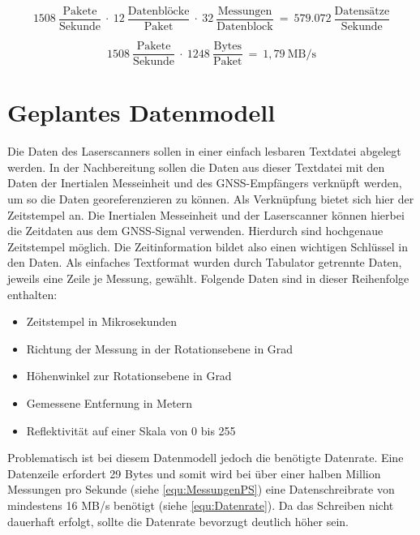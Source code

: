 \documentclass[a4paper,12pt,bibliography=totoc, listof=totoc,titlepage,pointlessnumbers]{scrreprt}
\begin{document}
\begin{equation}
1508~\frac{\text{Pakete}}{\text{Sekunde}}~\cdot~12~\frac{\text{Datenbl\"{o}cke}}{\text{Paket}}~\cdot~
32~\frac{\text{Messungen}}{\text{Datenblock}}~=~579.072~\frac{\text{Datens\"{a}tze}}{\text{Sekunde}}
 \label{equ:MessungenPS}
\end{equation}

\begin{equation}
1508~\frac{\text{Pakete}}{\text{Sekunde}}~\cdot~1248~\frac{\text{Bytes}}{\text{Paket}}~=~1,79~\text{MB/s}
 \label{equ:Ausgangsrate}
\end{equation}

\section{Geplantes Datenmodell}
\label{s:datenmodell}
Die Daten des Laserscanners sollen in einer einfach lesbaren Textdatei abgelegt werden. In der Nachbereitung sollen die Daten aus dieser Textdatei mit den Daten der Inertialen Messeinheit und des GNSS-Empfängers verknüpft werden, um so die Daten georeferenzieren zu können. Als Verknüpfung bietet sich hier der Zeitstempel an. Die Inertialen Messeinheit und der Laserscanner können hierbei die Zeitdaten aus dem GNSS-Signal verwenden. Hierdurch sind hochgenaue Zeitstempel möglich. Die Zeitinformation bildet also einen wichtigen Schlüssel in den Daten. Als einfaches Textformat wurden durch Tabulator getrennte Daten, jeweils eine Zeile je Messung, gewählt. Folgende Daten sind in dieser Reihenfolge enthalten:

\begin{itemize}
 \item Zeitstempel in Mikrosekunden
 \item Richtung der Messung in der Rotationsebene in Grad
 \item Höhenwinkel zur Rotationsebene in Grad
 \item Gemessene Entfernung in Metern
 \item Reflektivität auf einer Skala von 0 bis 255
\end{itemize}

Problematisch ist bei diesem Datenmodell jedoch die benötigte Datenrate. Eine Datenzeile erfordert 29 Bytes und somit wird bei über einer halben Million Messungen pro Sekunde (siehe \autoref{equ:MessungenPS}) eine Datenschreibrate von mindestens 16 MB/s benötigt (siehe \autoref{equ:Datenrate}). Da das Schreiben nicht dauerhaft erfolgt, sollte die Datenrate bevorzugt deutlich höher sein.
\end{document}
